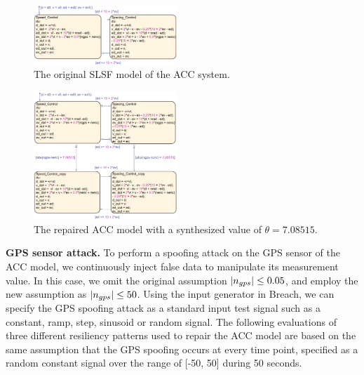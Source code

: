 
\begin{figure}[t!]%
	\centering%
    \includegraphics[width=0.48\textwidth]{image/acc_slsf_model}%
	\caption{The original SLSF model of the ACC system.}%
	\vspace{-1em}
\end{figure}%

\begin{figure}[t!]%
	\centering%
    \includegraphics[width=0.48\textwidth]{image/acc_model_pat1}%
	\caption{The repaired ACC model with a synthesized value of $\theta = 7.08515$.}%
	\vspace{-1em}
\end{figure}%
 
\vspace{0.5em}
\noindent
{\bf GPS sensor attack.} To perform a spoofing attack on the GPS sensor of the  ACC model, we continuously inject false data to manipulate its measurement value. In this case, we omit the original assumption $|n_{gps}| \leq 0.05$, and employ the new assumption as $|n_{gps}| \leq 50$. Using the input generator in Breach, we can specify the GPS spoofing attack as a standard input test signal such as a constant, ramp, step, sinusoid or random signal. The following evaluations of three different resiliency patterns used to repair the ACC model are based on the same assumption that the GPS spoofing occurs at every time point, specified as a random constant signal over the range of [-50, 50] during 50 seconds. 

